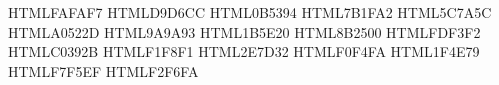%
%
%

\definecolor{codebg}      {HTML}{FAFAF7}
\definecolor{codeframe}   {HTML}{D9D6CC}
\definecolor{codekey}     {HTML}{0B5394}   %
\definecolor{codekeyb}    {HTML}{7B1FA2}   %
\definecolor{codecomment} {HTML}{5C7A5C}
\definecolor{codestring}  {HTML}{A0522D}
\definecolor{codenumber}  {HTML}{9A9A93}   %
\definecolor{accent}      {HTML}{1B5E20}
\definecolor{accentalt}   {HTML}{8B2500}
\definecolor{warnbg}      {HTML}{FDF3F2}
\definecolor{warnframe}   {HTML}{C0392B}
\definecolor{tipbg}       {HTML}{F1F8F1}
\definecolor{tipframe}    {HTML}{2E7D32}
\definecolor{notebg}      {HTML}{F0F4FA}
\definecolor{noteframe}   {HTML}{1F4E79}
\definecolor{vhdlbg}      {HTML}{F7F5EF}
\definecolor{svbg}        {HTML}{F2F6FA}

